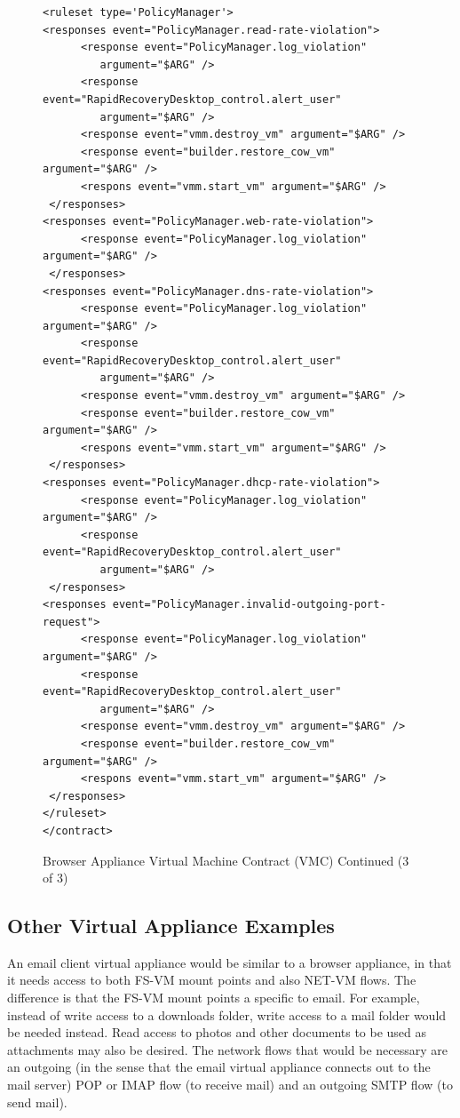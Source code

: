 \begin{figure}[tbp]
\caption{Browser Appliance Virtual Machine Contract (VMC) Continued (3 of 3)}
\label{lst:browser-appliance-cont2}

\begin{lstlisting}
<ruleset type='PolicyManager'>
<responses event="PolicyManager.read-rate-violation">
      <response event="PolicyManager.log_violation" 
         argument="$ARG" />
      <response event="RapidRecoveryDesktop_control.alert_user"
         argument="$ARG" />      
      <response event="vmm.destroy_vm" argument="$ARG" />
      <response event="builder.restore_cow_vm" argument="$ARG" />
      <respons event="vmm.start_vm" argument="$ARG" />
 </responses>
<responses event="PolicyManager.web-rate-violation">
      <response event="PolicyManager.log_violation" argument="$ARG" />
 </responses>
<responses event="PolicyManager.dns-rate-violation">
      <response event="PolicyManager.log_violation" argument="$ARG" />
      <response event="RapidRecoveryDesktop_control.alert_user" 
         argument="$ARG" />      
      <response event="vmm.destroy_vm" argument="$ARG" />
      <response event="builder.restore_cow_vm" argument="$ARG" />
      <respons event="vmm.start_vm" argument="$ARG" />
 </responses>
<responses event="PolicyManager.dhcp-rate-violation">
      <response event="PolicyManager.log_violation" argument="$ARG" />
      <response event="RapidRecoveryDesktop_control.alert_user" 
         argument="$ARG" />      
 </responses>
<responses event="PolicyManager.invalid-outgoing-port-request">
      <response event="PolicyManager.log_violation" argument="$ARG" />
      <response event="RapidRecoveryDesktop_control.alert_user" 
         argument="$ARG" />      
      <response event="vmm.destroy_vm" argument="$ARG" />
      <response event="builder.restore_cow_vm" argument="$ARG" />
      <respons event="vmm.start_vm" argument="$ARG" />
 </responses>
</ruleset>
</contract>
\end{lstlisting}
\end{figure}

\subsection{Other Virtual Appliance Examples}

An email client virtual appliance would be similar to a browser appliance, in that it needs access to both FS-VM mount points and also NET-VM flows. The difference is that the FS-VM mount points a specific to email. For example, instead of write access to a downloads folder, write access to a mail folder would be needed instead. Read access to photos and other documents to be used as attachments may also be desired. The network flows that would be necessary are an outgoing (in the sense that the email virtual appliance connects out to the mail server) POP or IMAP flow (to receive mail) and an outgoing SMTP flow (to send mail).

